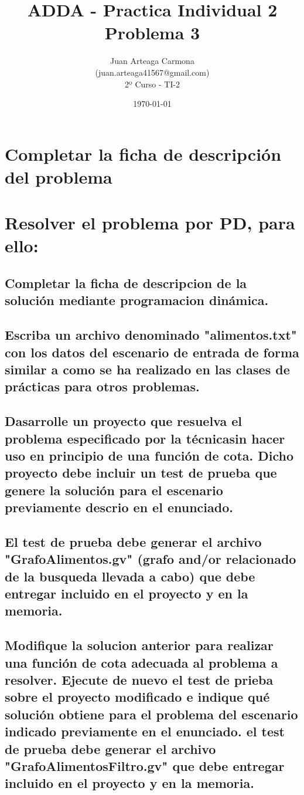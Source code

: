 \documentclass[a4paper,12pt]{article}
\title{ADDA - Practica Individual 2\\ Problema 3}
\author{Juan Arteaga Carmona\\(juan.arteaga41567@gmail.com)\\2º Curso - TI-2}
\date{\today}
\begin{document}
\maketitle

\section{Completar la ficha de descripción del problema}
\section{Resolver el problema por PD, para ello:}
\subsection{Completar la ficha de descripcion de la solución mediante programacion dinámica.}
\subsection{Escriba un archivo denominado "alimentos.txt" con los datos del escenario de entrada de forma similar a como se ha realizado en las clases de prácticas para otros problemas.}
\subsection{Dasarrolle un proyecto que resuelva el problema especificado por la técnicasin hacer uso en principio de una función de cota. Dicho proyecto debe incluir un test de prueba que genere la solución para el escenario previamente descrio en el enunciado.}
\subsection{El test de prueba debe generar el archivo "GrafoAlimentos.gv" (grafo and/or relacionado de la busqueda llevada a cabo) que debe entregar incluido en el proyecto y en la memoria.}
\subsection{Modifique la solucion anterior para realizar una función de cota adecuada al problema a resolver. Ejecute de nuevo el test de prieba sobre el proyecto modificado e indique qué solución obtiene para el problema del escenario indicado previamente en el enunciado. el test de prueba debe generar el archivo "GrafoAlimentosFiltro.gv" que debe entregar incluido en el proyecto y en la memoria.}
\end{document}
